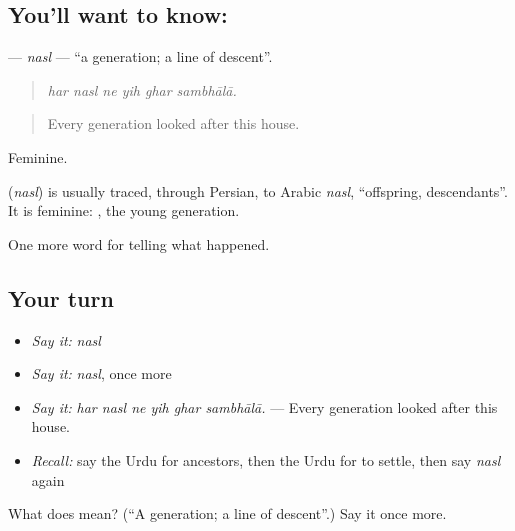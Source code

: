 \subsection*{You'll want to know: }
\textbf{} — \emph{nasl} — \textquotedblleft{}a generation; a line of descent\textquotedblright{}.

\begin{quote}
     
\end{quote}

\begin{quote}
\emph{har nasl ne yih ghar sambhālā.}
\end{quote}

\begin{quote}
Every generation looked after this house.
\end{quote}

Feminine.

\begin{cousinweb}
\textbf{} (\emph{nasl}) is usually traced, through Persian, to Arabic \emph{nasl}, \textquotedblleft{}offspring, descendants\textquotedblright{}. It is feminine: \textbf{ }, the young generation.
\end{cousinweb}

\begin{grammarlens}[title={What you've built}]
One more word for telling what happened.
\end{grammarlens}

\subsection*{Your turn}
\begin{itemize}
\raggedright
  \item \emph{Say it:} \emph{nasl}
  \item \emph{Say it:} \emph{nasl}, once more
  \item \emph{Say it:} \emph{har nasl ne yih ghar sambhālā.} — Every generation looked after this house.
  \item \emph{Recall:} say the Urdu for ancestors, then the Urdu for to settle, then say \emph{nasl} again
\end{itemize}

\begin{tcolorbox}[breakable,colback=teal!4,colframe=teal!35!black,title={Before you move on}]
What does  mean? (\textquotedblleft{}A generation; a line of descent\textquotedblright{}.) Say it once more.
\end{tcolorbox}
